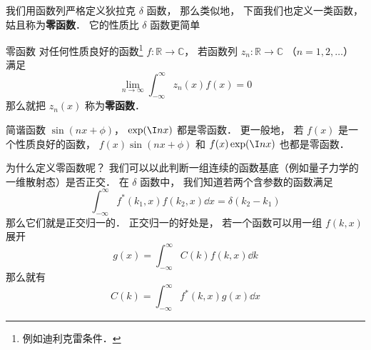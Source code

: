 
\begin{issues}
\issueDraft
{}
\end{issues}

我们用函数列严格定义狄拉克 $\delta$ 函数， 那么类似地， 下面我们也定义一类函数， 姑且称为\textbf{零函数}． 它的性质比 $\delta$ 函数更简单
\begin{definition}{零函数}
对任何性质良好的函数\footnote{例如迪利克雷条件．} $f: \mathbb R \to \mathbb C$， 若函数列 $z_n: \mathbb R \to \mathbb C$ （$n = 1, 2, \dots$） 满足
\begin{equation}
\lim_{n\to \infty}\int_{-\infty}^{\infty} z_n(x) f(x) = 0
\end{equation}
那么就把 $z_n(x)$ 称为\textbf{零函数}．
\end{definition}

\begin{example}{}
简谐函数 $\sin(nx + \phi)$， $\exp(\I n x)$ 都是零函数． 更一般地， 若 $f(x)$ 是一个性质良好的函数， $f(x)\sin(nx + \phi)$ 和 $f(x)\exp(\I n x)$ 也都是零函数．
\end{example}

为什么定义零函数呢？ 我们可以以此判断一组连续的函数基底（例如量子力学的一维散射态）是否正交． 在 $\delta$ 函数中， 我们知道若两个含参数的函数满足
\begin{equation}
\int_{-\infty}^{\infty} f^*(k_1, x) f(k_2, x)\dd{x} = \delta(k_2 - k_1)
\end{equation}
那么它们就是正交归一的． 正交归一的好处是， 若一个函数可以用一组 $f(k, x)$ 展开
\begin{equation}
g(x) = \int_{-\infty}^{\infty} C(k) f(k, x) \dd{k}
\end{equation}
那么就有
\begin{equation}
C(k) = \int_{-\infty}^{\infty} f^*(k, x)g(x)\dd{x}
\end{equation}
